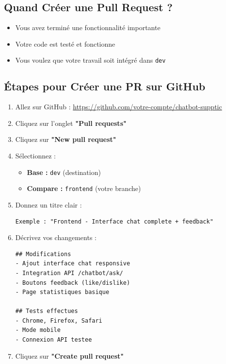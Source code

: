 \documentclass[11pt,a4paper]{article}
\begin{document}
\subsection{Quand Créer une Pull Request ?}

\begin{itemize}
    \item[\faIcon{check}] Vous avez terminé une fonctionnalité importante
    \item[\faIcon{check}] Votre code est testé et fonctionne
    \item[\faIcon{check}] Vous voulez que votre travail soit intégré dans \texttt{dev}
\end{itemize}

\subsection{Étapes pour Créer une PR sur GitHub}

\begin{enumerate}
    \item Allez sur GitHub : \url{https://github.com/votre-compte/chatbot-supptic}
    
    \item Cliquez sur l'onglet \textbf{"Pull requests"}
    
    \item Cliquez sur \textbf{"New pull request"}
    
    \item Sélectionnez :
    \begin{itemize}
        \item \textbf{Base :} \texttt{dev} (destination)
        \item \textbf{Compare :} \texttt{frontend} (votre branche)
    \end{itemize}
    
    \item Donnez un titre clair :
    \begin{lstlisting}
Exemple : "Frontend - Interface chat complete + feedback"
    \end{lstlisting}
    
    \item Décrivez vos changements :
    \begin{lstlisting}
## Modifications
- Ajout interface chat responsive
- Integration API /chatbot/ask/
- Boutons feedback (like/dislike)
- Page statistiques basique

## Tests effectues
- Chrome, Firefox, Safari
- Mode mobile
- Connexion API testee
    \end{lstlisting}
    
    \item Cliquez sur \textbf{"Create pull request"}
\end{enumerate}
\end{document}

